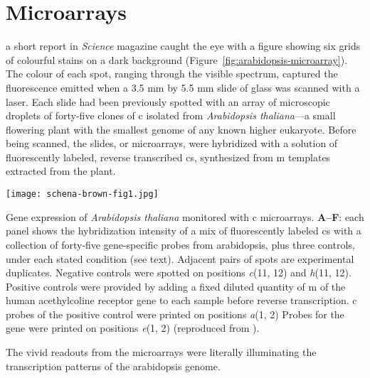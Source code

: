 \section{Microarrays}

 a short report in \emph{Science} magazine caught
the eye with a figure showing six grids of colourful stains on a dark background
(Figure~\ref{fig:arabidopsis-microarray}).  The colour of each spot, ranging
through the visible spectrum, captured the fluorescence emitted when a 3.5 mm by
5.5 mm slide of glass was scanned with a laser.  Each slide had been previously
spotted with an array of microscopic droplets of \mbox{forty-five} clones of
c isolated from \emph{Arabidopsis thaliana}---a small flowering
plant with the smallest genome of any known higher eukaryote.  Before being
scanned, the slides, or microarrays, were hybridized with a solution of
fluorescently labeled, reverse transcribed cs, synthesized from
m templates extracted from the plant.

\begin{marginfigure}%
  \texttt{[image: schena-brown-fig1.jpg]}
  \caption[Gene expression of \emph{Arabidopsis thaliana} monitored with
  c microarrays]{Gene expression of \emph{Arabidopsis thaliana}
    monitored with c microarrays. \textbf{A--F}: each panel shows
    the hybridization intensity of a mix of fluorescently labeled
    cs with a collection of \mbox{forty-five}
    \mbox{gene-specific} probes from arabidopsis, plus three controls, under
    each stated condition (see text).  Adjacent pairs of spots are experimental
    duplicates.  Negative controls were spotted on positions \emph{c}(11, 12)
    and \emph{h}(11, 12).  Positive controls were provided by adding a fixed
    diluted quantity of m of the human acethylcoline receptor
    gene to each sample before reverse transcription.  c probes
    of the positive control were printed on positions \emph{a}(1, 2) Probes for
    the \emph{} gene were printed on positions \emph{e}(1, 2)
    (reproduced from \citealp{schena_quantitative_1995}).}
  \label{fig:arabidopsis-microarray}
\end{marginfigure}

The vivid readouts from the microarrays were literally illuminating the
transcription patterns of the arabidopsis genome.

\bigskip

